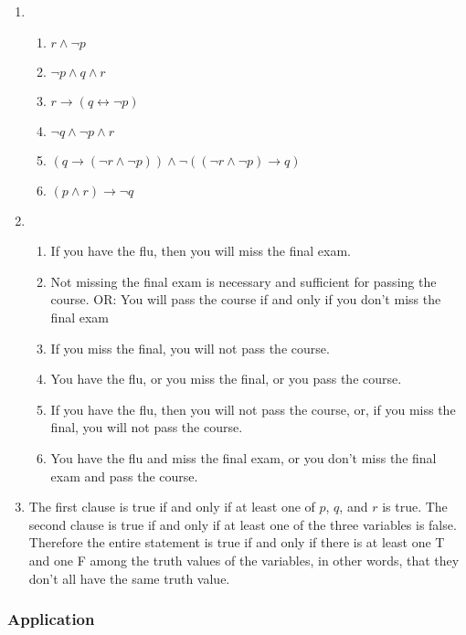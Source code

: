 \documentclass{sig-alternate-05-2015}
\begin{document}
\begin{enumerate}
\item
\begin{enumerate}
\item $r \wedge \neg  p$
\item $\neg p \wedge q\wedge r$
\item $r \rightarrow (q \leftrightarrow \neg p) $
\item $\neg q \wedge \neg p \wedge r$
\item $(q \rightarrow (\neg r\wedge \neg p))\wedge \neg((\neg r \wedge \neg p) \rightarrow q)$
\item $(p \wedge r) \rightarrow \neg q$
\end{enumerate}
\item
\begin{enumerate}
	\item If you have the flu, then you will miss the final exam.

	\item Not missing the final exam is necessary and sufficient for passing the course. OR: You
	will pass the course if and only if you don't miss the final exam
	\item If you miss the final, you will not pass the course.
	\item You have the flu, or you miss the final, or you pass the course.
	\item If you have the flu, then you will not pass the course, or, if you miss the final, you will
	not pass the course.
	\item You have the flu and miss the final exam, or you don't miss the final exam and pass
	the course.
\end{enumerate}

\item The first clause is true if and only if at least one of $p$, $q$, and
$r$ is true. The second clause is true if and only if at least one of
the three variables is false. Therefore the entire statement is
true if and only if there is at least one T and one F among the
truth values of the variables, in other words, that they don\textquoteright t all
have the same truth value.

\end{enumerate}

\subsubsection{Application}
\end{document}
